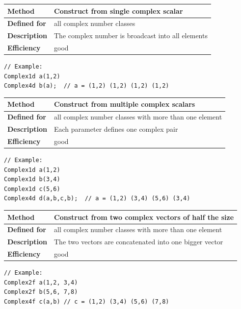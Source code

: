 \documentclass[11pt,a4paper,oneside,openright]{report}
\newcommand{\vspacesmall}{\vspace{3mm}}
\newcommand{\vspacebig}{\vspace{6mm}}
\begin{document}
\begin{tabular}{|p{25mm}|p{100mm}|}
\hline
\bfseries Method & Construct from single complex scalar \\ \hline
\bfseries Defined for & all complex number classes \\ \hline
\bfseries Description & The complex number is broadcast into all elements \\ \hline
\bfseries Efficiency & good \\ \hline
\end{tabular}
\vspacesmall

\begin{lstlisting}[frame=none]
// Example:
Complex1d a(1,2)
Complex4d b(a);  // a = (1,2) (1,2) (1,2) (1,2)
\end{lstlisting}
\vspacebig


\begin{tabular}{|p{25mm}|p{100mm}|}
\hline
\bfseries Method & Construct from multiple complex scalars \\ \hline
\bfseries Defined for & all complex number classes with more than one element \\ \hline
\bfseries Description & Each parameter defines one complex pair \\ \hline
\bfseries Efficiency & good \\ \hline
\end{tabular}
\vspacesmall

\begin{lstlisting}[frame=none]
// Example:
Complex1d a(1,2)
Complex1d b(3,4)
Complex1d c(5,6)
Complex4d d(a,b,c,b);  // a = (1,2) (3,4) (5,6) (3,4)
\end{lstlisting}
\vspacebig


\begin{tabular}{|p{25mm}|p{100mm}|}
\hline
\bfseries Method & Construct from two complex vectors of half the size \\ \hline
\bfseries Defined for & all complex number classes with more than one element \\ \hline
\bfseries Description & The two vectors are concatenated into one bigger vector \\ \hline
\bfseries Efficiency & good \\ \hline
\end{tabular}
\vspacesmall

\begin{lstlisting}[frame=none]
// Example:
Complex2f a(1,2, 3,4)
Complex2f b(5,6, 7,8)
Complex4f c(a,b) // c = (1,2) (3,4) (5,6) (7,8)
\end{lstlisting}
\vspacebig
\end{document}
